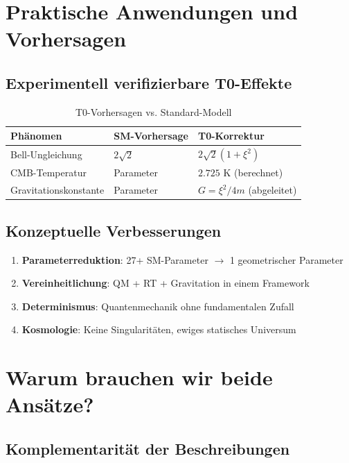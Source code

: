 	\section{Praktische Anwendungen und Vorhersagen}
	
	\subsection{Experimentell verifizierbare T0-Effekte}
	
	\begin{table}[h]
		\centering
		\begin{tabular}{|l|l|l|}
			\hline
			\textbf{Phänomen} & \textbf{SM-Vorhersage} & \textbf{T0-Korrektur} \\
			\hline
			Bell-Ungleichung & $2\sqrt{2}$ & $2\sqrt{2}(1 + \xi^2)$ \\
			CMB-Temperatur & Parameter & $2.725$ K (berechnet) \\
			Gravitationskonstante & Parameter & $G = \xi^2/4m$ (abgeleitet) \\
			\hline
		\end{tabular}
		\caption{T0-Vorhersagen vs. Standard-Modell}
	\end{table}
	
	\subsection{Konzeptuelle Verbesserungen}
	
	\begin{enumerate}
		\item \textbf{Parameterreduktion}: 27+ SM-Parameter $\to$ 1 geometrischer Parameter
		\item \textbf{Vereinheitlichung}: QM + RT + Gravitation in einem Framework
		\item \textbf{Determinismus}: Quantenmechanik ohne fundamentalen Zufall
		\item \textbf{Kosmologie}: Keine Singularitäten, ewiges statisches Universum
	\end{enumerate}
	
	\section{Warum brauchen wir beide Ansätze?}
	
	\subsection{Komplementarität der Beschreibungen}
	
